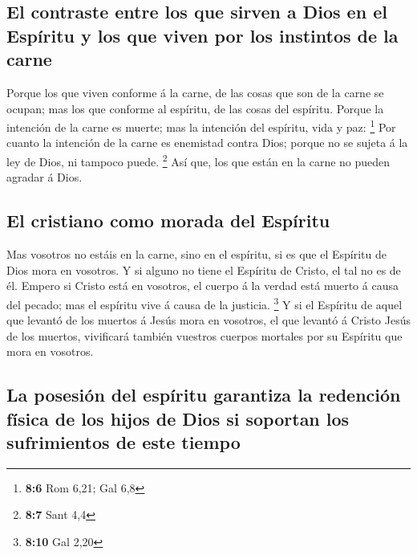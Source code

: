 \hypertarget{el-contraste-entre-los-que-sirven-a-dios-en-el-espuxedritu-y-los-que-viven-por-los-instintos-de-la-carne}{%
\subsection{El contraste entre los que sirven a Dios en el Espíritu y
los que viven por los instintos de la
carne}\label{el-contraste-entre-los-que-sirven-a-dios-en-el-espuxedritu-y-los-que-viven-por-los-instintos-de-la-carne}}

 Porque los que viven conforme á la carne, de las cosas que
son de la carne se ocupan; mas los que conforme al espíritu, de las
cosas del espíritu.  Porque la intención de la carne es
muerte; mas la intención del espíritu, vida y paz: \footnote{\textbf{8:6}
  Rom 6,21; Gal 6,8}  Por cuanto la intención de la carne es
enemistad contra Dios; porque no se sujeta á la ley de Dios, ni tampoco
puede. \footnote{\textbf{8:7} Sant 4,4}  Así que, los que
están en la carne no pueden agradar á Dios.

\hypertarget{el-cristiano-como-morada-del-espuxedritu}{%
\subsection{El cristiano como morada del
Espíritu}\label{el-cristiano-como-morada-del-espuxedritu}}

 Mas vosotros no estáis en la carne, sino en el espíritu, si
es que el Espíritu de Dios mora en vosotros. Y si alguno no tiene el
Espíritu de Cristo, el tal no es de él.  Empero si Cristo
está en vosotros, el cuerpo á la verdad está muerto á causa del pecado;
mas el espíritu vive á causa de la justicia. \footnote{\textbf{8:10} Gal
  2,20}  Y si el Espíritu de aquel que levantó de los
muertos á Jesús mora en vosotros, el que levantó á Cristo Jesús de los
muertos, vivificará también vuestros cuerpos mortales por su Espíritu
que mora en vosotros.

\hypertarget{la-posesiuxf3n-del-espuxedritu-garantiza-la-redenciuxf3n-fuxedsica-de-los-hijos-de-dios-si-soportan-los-sufrimientos-de-este-tiempo}{%
\subsection{La posesión del espíritu garantiza la redención física de
los hijos de Dios si soportan los sufrimientos de este
tiempo}\label{la-posesiuxf3n-del-espuxedritu-garantiza-la-redenciuxf3n-fuxedsica-de-los-hijos-de-dios-si-soportan-los-sufrimientos-de-este-tiempo}}

